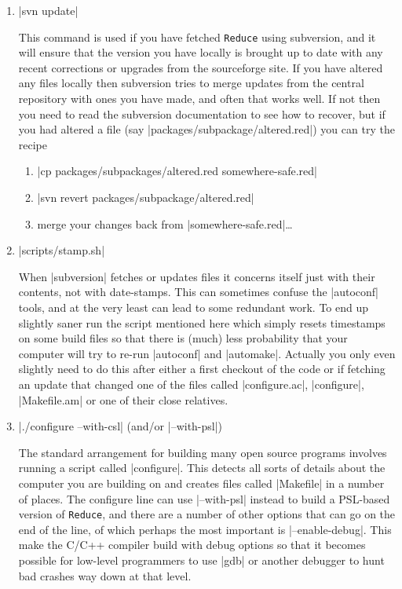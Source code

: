 \documentclass[12pt,twoside,openright]{memoir}
\newcommand{\reduce}{\texttt{Reduce}\xspace}
\begin{document}
\begin{enumerate}
\item |svn update|

This command is used if you have fetched \reduce using subversion, and it will
ensure that the version you have locally is brought up to date with any
recent corrections or upgrades from the sourceforge site. If you have altered
any files locally then subversion tries to merge updates from the central
repository with ones you have made, and often that works well. If not then
you need to read the subversion documentation to see how to recover, but if
you had altered a file (say |packages/subpackage/altered.red|) you can try
the recipe
\begin{enumerate}
\item |cp packages/subpackages/altered.red somewhere-safe.red|
\item |svn revert packages/subpackage/altered.red|
\item merge your changes back from |somewhere-safe.red|\ldots
\end{enumerate}

\item |scripts/stamp.sh|

  When |subversion| fetches or updates files it concerns itself just with their
  contents, not with date-stamps. This can sometimes confuse the |autoconf|
  tools, and at the very least can lead to some redundant work. To end up
  slightly saner run the script mentioned here which simply resets timestamps
  on some build files so that there is (much) less probability that your
  computer will try to re-run |autoconf| and |automake|. Actually you only even
  slightly need to do this after either a first checkout of the code or if
  fetching an update that changed one of the files called |configure.ac|,
  |configure|, |Makefile.am| or one of their close relatives.

\item |./configure --with-csl| (and/or |--with-psl|)

The standard arrangement for building many open source programs involves
running a script called |configure|. This detects all sorts of details about
the computer you are building on and creates files called |Makefile| in
a number of places. The configure line can use |--with-psl| instead to
build a PSL-based version of \reduce, and there are a number of other
options that can go on the end of the line, of which perhaps the most
important is |--enable-debug|. This make the C/C++ compiler build with
debug options so that it becomes possible for low-level programmers to
use |gdb| or another debugger to hunt bad crashes way down at that level.


\end{enumerate}
\end{document}

